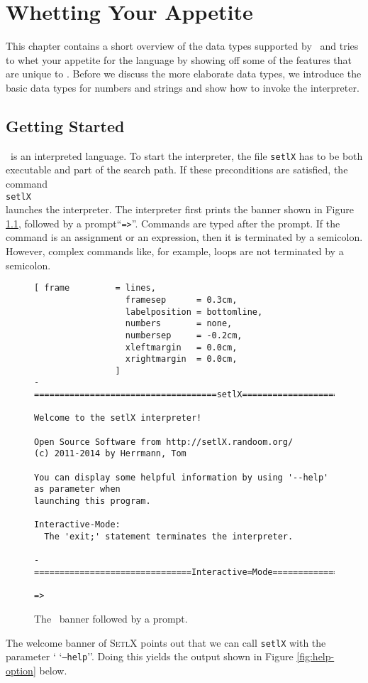 \chapter{Whetting Your Appetite}
This chapter contains a short overview of the data types supported by
\setlx\ and tries to whet your appetite for the language by showing off some of
the features that are unique to \setlx.  Before we discuss the more elaborate data types,
we introduce the basic data types for numbers and strings and show how to invoke the interpreter.


\section{Getting Started}
\setlx\ is an interpreted language.  To start the interpreter,  the file
\texttt{setlX} has to be both executable and part of the search path.   If these
preconditions are satisfied, the command
\\[0.2cm]
\hspace*{1.3cm}
\texttt{setlX}
\\[0.2cm]
 launches the interpreter.  The interpreter first prints the banner shown in Figure
\ref{fig:banner}, followed by a prompt``\texttt{=>}''.  Commands are typed after the prompt.    
If the command is an assignment or an expression, then it is terminated by a semicolon.
However, complex commands like, for example, loops are not terminated by a semicolon.

\begin{figure}[!ht]
\centering
\begin{Verbatim}[ frame         = lines, 
                  framesep      = 0.3cm, 
                  labelposition = bottomline,
                  numbers       = none,
                  numbersep     = -0.2cm,
                  xleftmargin   = 0.0cm,
                  xrightmargin  = 0.0cm,
                ]
-====================================setlX=============================v2.2.2=-

Welcome to the setlX interpreter!

Open Source Software from http://setlX.randoom.org/
(c) 2011-2014 by Herrmann, Tom

You can display some helpful information by using '--help' as parameter when
launching this program.

Interactive-Mode:
  The 'exit;' statement terminates the interpreter.

-===============================Interactive=Mode==============================-

=> 
\end{Verbatim}
\vspace*{-0.3cm}
\caption{The \setlx\ banner followed by a prompt.}
\label{fig:banner}
\end{figure}
\noindent
The welcome banner of \textsc{SetlX} points out that we can call \texttt{setlX} with the parameter `
`\texttt{--help}''.   Doing this yields the output shown in Figure \ref{fig:help-option} below. 

